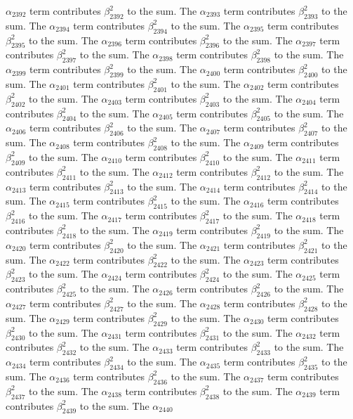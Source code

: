 \begin{lemma}
$\alpha_{2392}$ term contributes $\beta_{2392}^{2}$ to the sum. The $\alpha_{2393}$ term contributes $\beta_{2393}^{2}$ to the sum. The $\alpha_{2394}$ term contributes $\beta_{2394}^{2}$ to the sum. The $\alpha_{2395}$ term contributes $\beta_{2395}^{2}$ to the sum. The $\alpha_{2396}$ term contributes $\beta_{2396}^{2}$ to the sum. The $\alpha_{2397}$ term contributes $\beta_{2397}^{2}$ to the sum. The $\alpha_{2398}$ term contributes $\beta_{2398}^{2}$ to the sum. The $\alpha_{2399}$ term contributes $\beta_{2399}^{2}$ to the sum. The $\alpha_{2400}$ term contributes $\beta_{2400}^{2}$ to the sum. The $\alpha_{2401}$ term contributes $\beta_{2401}^{2}$ to the sum. The $\alpha_{2402}$ term contributes $\beta_{2402}^{2}$ to the sum. The $\alpha_{2403}$ term contributes $\beta_{2403}^{2}$ to the sum. The $\alpha_{2404}$ term contributes $\beta_{2404}^{2}$ to the sum. The $\alpha_{2405}$ term contributes $\beta_{2405}^{2}$ to the sum. The $\alpha_{2406}$ term contributes $\beta_{2406}^{2}$ to the sum. The $\alpha_{2407}$ term contributes $\beta_{2407}^{2}$ to the sum. The $\alpha_{2408}$ term contributes $\beta_{2408}^{2}$ to the sum. The $\alpha_{2409}$ term contributes $\beta_{2409}^{2}$ to the sum. The $\alpha_{2410}$ term contributes $\beta_{2410}^{2}$ to the sum. The $\alpha_{2411}$ term contributes $\beta_{2411}^{2}$ to the sum. The $\alpha_{2412}$ term contributes $\beta_{2412}^{2}$ to the sum. The $\alpha_{2413}$ term contributes $\beta_{2413}^{2}$ to the sum. The $\alpha_{2414}$ term contributes $\beta_{2414}^{2}$ to the sum. The $\alpha_{2415}$ term contributes $\beta_{2415}^{2}$ to the sum. The $\alpha_{2416}$ term contributes $\beta_{2416}^{2}$ to the sum. The $\alpha_{2417}$ term contributes $\beta_{2417}^{2}$ to the sum. The $\alpha_{2418}$ term contributes $\beta_{2418}^{2}$ to the sum. The $\alpha_{2419}$ term contributes $\beta_{2419}^{2}$ to the sum. The $\alpha_{2420}$ term contributes $\beta_{2420}^{2}$ to the sum. The $\alpha_{2421}$ term contributes $\beta_{2421}^{2}$ to the sum. The $\alpha_{2422}$ term contributes $\beta_{2422}^{2}$ to the sum. The $\alpha_{2423}$ term contributes $\beta_{2423}^{2}$ to the sum. The $\alpha_{2424}$ term contributes $\beta_{2424}^{2}$ to the sum. The $\alpha_{2425}$ term contributes $\beta_{2425}^{2}$ to the sum. The $\alpha_{2426}$ term contributes $\beta_{2426}^{2}$ to the sum. The $\alpha_{2427}$ term contributes $\beta_{2427}^{2}$ to the sum. The $\alpha_{2428}$ term contributes $\beta_{2428}^{2}$ to the sum. The $\alpha_{2429}$ term contributes $\beta_{2429}^{2}$ to the sum. The $\alpha_{2430}$ term contributes $\beta_{2430}^{2}$ to the sum. The $\alpha_{2431}$ term contributes $\beta_{2431}^{2}$ to the sum. The $\alpha_{2432}$ term contributes $\beta_{2432}^{2}$ to the sum. The $\alpha_{2433}$ term contributes $\beta_{2433}^{2}$ to the sum. The $\alpha_{2434}$ term contributes $\beta_{2434}^{2}$ to the sum. The $\alpha_{2435}$ term contributes $\beta_{2435}^{2}$ to the sum. The $\alpha_{2436}$ term contributes $\beta_{2436}^{2}$ to the sum. The $\alpha_{2437}$ term contributes $\beta_{2437}^{2}$ to the sum. The $\alpha_{2438}$ term contributes $\beta_{2438}^{2}$ to the sum. The $\alpha_{2439}$ term contributes $\beta_{2439}^{2}$ to the sum. The $\alpha_{2440}$ 
\end{lemma}
